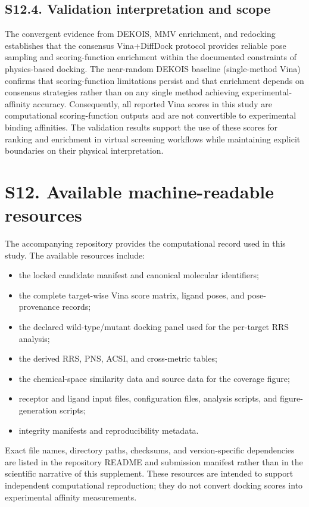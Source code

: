 \documentclass[journal=jcisd8,manuscript=suppinfo]{achemso}
\begin{document}
\subsection*{S12.4. Validation interpretation and scope}
The convergent evidence from DEKOIS, MMV enrichment, and redocking establishes that the consensus Vina+DiffDock protocol provides reliable pose sampling and scoring-function enrichment within the documented constraints of physics-based docking. The near-random DEKOIS baseline (single-method Vina) confirms that scoring-function limitations persist and that enrichment depends on consensus strategies rather than on any single method achieving experimental-affinity accuracy. Consequently, all reported Vina scores in this study are computational scoring-function outputs and are not convertible to experimental binding affinities. The validation results support the use of these scores for ranking and enrichment in virtual screening workflows while maintaining explicit boundaries on their physical interpretation.

\section*{S12. Available machine-readable resources}
The accompanying repository provides the computational record used in this study. The available resources include:
\begin{itemize}
    \item the locked candidate manifest and canonical molecular identifiers;
    \item the complete target-wise Vina score matrix, ligand poses, and pose-provenance records;
    \item the declared wild-type/mutant docking panel used for the per-target RRS analysis;
    \item the derived RRS, PNS, ACSI, and cross-metric tables;
    \item the chemical-space similarity data and source data for the coverage figure;
    \item receptor and ligand input files, configuration files, analysis scripts, and figure-generation scripts;
    \item integrity manifests and reproducibility metadata.
\end{itemize}
Exact file names, directory paths, checksums, and version-specific dependencies are listed in the repository README and submission manifest rather than in the scientific narrative of this supplement. These resources are intended to support independent computational reproduction; they do not convert docking scores into experimental affinity measurements.


\end{document}

